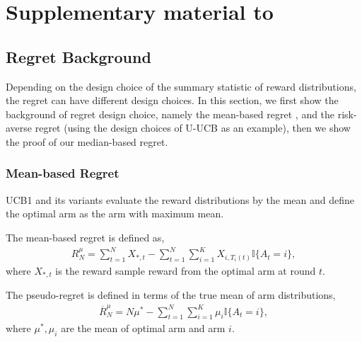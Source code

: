

\chapter{Supplementary material to \ourtitle} \label{appA}

\section{Regret Background}
\label{app-sec: Design Choice of Regret}

Depending on the design choice of the summary statistic of reward distributions, the regret can have different design choices.
In this section, we first show the background of regret design choice, namely the mean-based regret \cite{Auer2002, audibert2009exploration, garivier2011kl}, and the risk-averse regret (using the design choices of U-UCB \cite{cassel_general_2018} as an example), then we show the proof of our median-based regret. 

\subsection{Mean-based Regret}
\label{app-subsec: Mean-based regret}
UCB1 and its variants \cite{Auer2002, audibert2009exploration, garivier2011kl} evaluate the reward distributions by the mean and define the optimal arm as the arm with maximum mean. 

\begin{defi}
\label{defi: mean-based regret}
The mean-based regret is defined as,
\begin{align}
    R^\mu_{N}= \sum_{t=1}^{N} X_{\ast, t}-\sum_{t=1}^{N} \sum_{i = 1}^{K} X_{i, T_i(t)} \mathbb{I}\{A_t = i\}, \nonumber
\end{align}
where 
$X_{\ast, t}$ is the reward sample reward from the optimal arm at round $t$.
\end{defi}

\begin{defi}
\label{defi: mean-based pseudo regret}
The pseudo-regret is defined in terms of the true mean of arm distributions,
\begin{align}
    \overline{R}^\mu_{N} =
    N \mu^{*}-\sum_{t=1}^{N} \sum_{i = 1}^{K} \mu_i \mathbb{I}\{A_t = i\}, \nonumber
\end{align}
where $\mu^\ast, \mu_i$ are the mean of optimal arm and arm $i$.
\end{defi}

